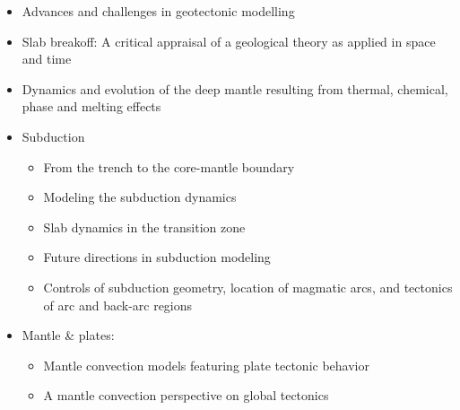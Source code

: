 \begin{itemize}
\item Advances and challenges in geotectonic modelling \cite{bufy14}
\item Slab breakoff: A critical appraisal of a geological theory as applied in space and time \cite{garm18}
\item Dynamics and evolution of the deep mantle resulting from thermal, chemical, phase and melting effects \cite{tack12}

\item Subduction
   \begin{itemize}
   \item From the trench to the core-mantle boundary \cite{kinc95}
   \item Modeling the subduction dynamics \cite{bill08}
   \item Slab dynamics in the transition zone \cite{bill10}
   \item Future directions in subduction modeling \cite{gery11}
   \item Controls of subduction geometry, location of magmatic arcs, 
         and tectonics of arc and back-arc regions \cite{crpi82}
   \end{itemize}
\item Mantle \& plates:
   \begin{itemize}
   \item Mantle convection models featuring plate tectonic behavior \cite{lowm11}
   \item A mantle convection perspective on global tectonics \cite{cogu17}
   \end{itemize}



\end{itemize}
